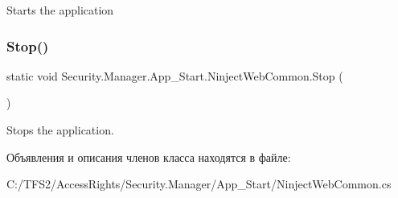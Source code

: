 Starts the application 

\mbox{\label{class_security_1_1_manager_1_1_app___start_1_1_ninject_web_common_ae7b72f5a95064ff4c9de7677b6d9c37f}} 
\subsubsection{\texorpdfstring{Stop()}{Stop()}}
{\footnotesize\ttfamily static void Security.\+Manager.\+App\+\_\+\+Start.\+Ninject\+Web\+Common.\+Stop (\begin{DoxyParamCaption}{ }\end{DoxyParamCaption})\hspace{0.3cm}{\ttfamily [static]}}



Stops the application. 



Объявления и описания членов класса находятся в файле\+:\begin{DoxyCompactItemize}
\item 
C\+:/\+T\+F\+S2/\+Access\+Rights/\+Security.\+Manager/\+App\+\_\+\+Start/Ninject\+Web\+Common.\+cs\end{DoxyCompactItemize}
